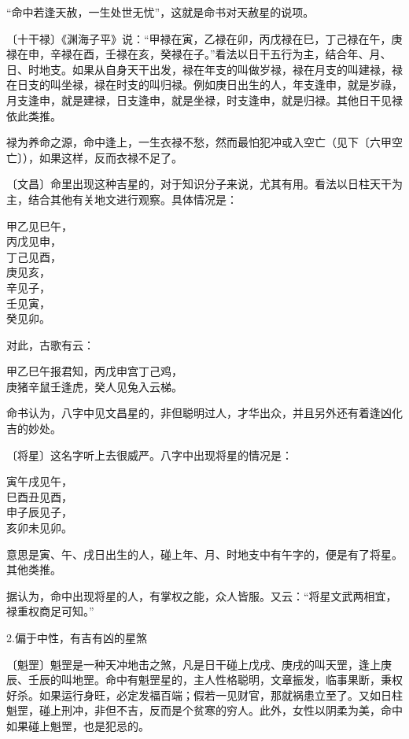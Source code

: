 \documentclass[a5paper,oneside,12pt]{ctexbook}
\newenvironment{tightcenter}{%
  \setlength\topsep{0pt}
  \setlength\parskip{0pt}
  \begin{center}\kaishu 
}{%
  \end{center}
}
\begin{document}
“命中若逢天赦，一生处世无忧”，这就是命书对天赦星的说项。

〔十干禄〕《渊海子平》说：“甲禄在寅，乙禄在卯，丙戊禄在巳，丁己禄在午，庚禄在申，辛禄在酉，壬禄在亥，癸禄在子。”看法以日干五行为主，结合年、月、日、时地支。如果从自身天干出发，禄在年支的叫做岁禄，禄在月支的叫建禄，禄在日支的叫坐禄，禄在时支的叫归禄。例如庚日出生的人，年支逢申，就是岁祿，月支逢申，就是建禄，日支逢申，就是坐禄，时支逢申，就是归禄。其他日干见禄依此类推。

禄为养命之源，命中逢上，一生衣禄不愁，然而最怕犯冲或入空亡（见下〔六甲空亡〕），如果这样，反而衣禄不足了。

〔文昌〕命里出现这种吉星的，对于知识分子来说，尤其有用。看法以日柱天干为主，结合其他有关地文进行观察。具体情况是：
\begin{tightcenter}
    甲乙见巳午，\\
    丙戊见申，\\
    丁己见酉，\\
    庚见亥，\\
    辛见子，\\
    壬见寅，\\
    癸见卯。\\    
\end{tightcenter}
对此，古歌有云：
\begin{tightcenter}
    甲乙巳午报君知，丙戊申宫丁己鸡，\\
    庚猪辛鼠壬逢虎，癸人见兔入云梯。\\    
\end{tightcenter}
命书认为，八字中见文昌星的，非但聪明过人，才华出众，并且另外还有着逢凶化吉的妙处。

〔将星〕这名字听上去很威严。八字中出现将星的情况是：
\begin{tightcenter}
    寅午戌见午，\\
    巳酉丑见酉，\\
    申子辰见子，\\
    亥卯未见卯。\\
\end{tightcenter}
意思是寅、午、戌日出生的人，碰上年、月、时地支中有午字的，便是有了将星。其他类推。

据认为，命中出现将星的人，有掌权之能，众人皆服。又云：“将星文武两相宜，禄重权商足可知。”

2.偏于中性，有吉有凶的星煞

〔魁罡〕魁罡是一种天冲地击之煞，凡是日干碰上戊戌、庚戌的叫天罡，逢上庚辰、壬辰的叫地罡。命中有魁罡星的，主人性格聪明，文章振发，临事果断，秉权好杀。如果运行身旺，必定发福百端；假若一见财官，那就祸患立至了。又如日柱魁罡，碰上刑冲，非但不吉，反而是个贫寒的穷人。此外，女性以阴柔为美，命中如果碰上魁罡，也是犯忌的。
\end{document}
